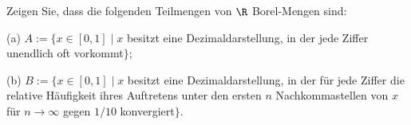 \begin{prob}
Zeigen Sie, dass die folgenden Teilmengen von $\R$ Borel-Mengen sind:

(a) $A:=\{x\in[0,1] \mid x $ besitzt eine Dezimaldarstellung, in der jede Ziffer unendlich oft vorkommt$\}$;

(b) $B:=\{x\in[0,1] \mid x $ besitzt eine Dezimaldarstellung, in der f\"ur jede Ziffer die relative H\"aufigkeit ihres Auftretens unter den ersten $n$ Nachkommastellen von $x$ f\"ur $n\to\infty$ gegen $1/10$ konvergiert$\}$.
\end{prob}
